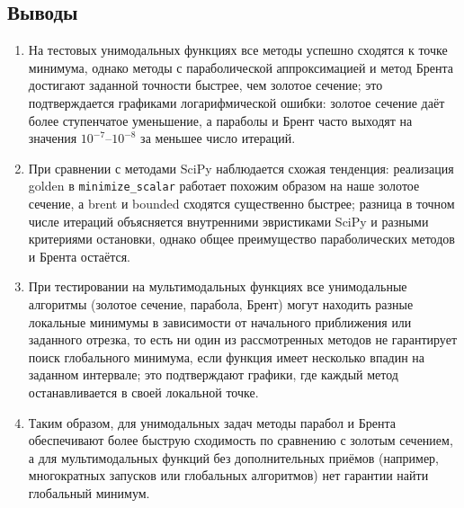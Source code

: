 \documentclass[a4paper,12pt]{article}
\begin{document}
\subsection{Выводы}
\begin{enumerate}
    \item На тестовых унимодальных функциях все методы успешно сходятся к точке минимума, однако методы с параболической аппроксимацией и метод Брента достигают заданной точности быстрее, чем золотое сечение; это подтверждается графиками логарифмической ошибки: золотое сечение даёт более ступенчатое уменьшение, а параболы и Брент часто выходят на значения $10^{-7}$--$10^{-8}$ за меньшее число итераций.
    \item При сравнении с методами SciPy наблюдается схожая тенденция: реализация golden в \texttt{minimize\_scalar} работает похожим образом на наше золотое сечение, а brent и bounded сходятся существенно быстрее; разница в точном числе итераций объясняется внутренними эвристиками SciPy и разными критериями остановки, однако общее преимущество параболических методов и Брента остаётся.
    \item При тестировании на мультимодальных функциях все унимодальные алгоритмы (золотое сечение, парабола, Брент) могут находить разные локальные минимумы в зависимости от начального приближения или заданного отрезка, то есть ни один из рассмотренных методов не гарантирует поиск глобального минимума, если функция имеет несколько впадин на заданном интервале; это подтверждают графики, где каждый метод останавливается в своей локальной точке.
    \item Таким образом, для унимодальных задач методы парабол и Брента обеспечивают более быструю сходимость по сравнению с золотым сечением, а для мультимодальных функций без дополнительных приёмов (например, многократных запусков или глобальных алгоритмов) нет гарантии найти глобальный минимум.
\end{enumerate}
\end{document}
